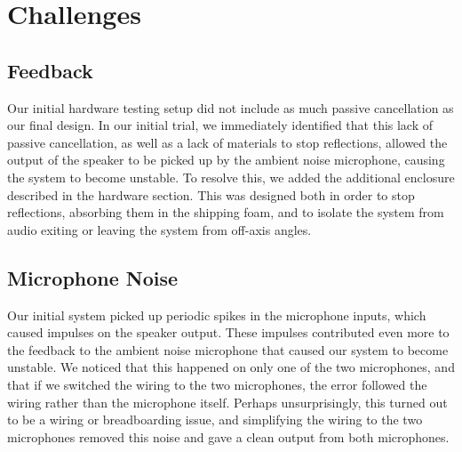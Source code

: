 \documentclass{fpgairpods}
\begin{document}
\section{Challenges}
\subsection{Feedback}
Our initial hardware testing setup did not include as much passive cancellation as our final design. In our initial trial, we immediately identified that this lack of passive cancellation, as well as a lack of materials to stop reflections, allowed the output of the speaker to be picked up by the ambient noise microphone, causing the system to become unstable. To resolve this, we added the additional enclosure described in the hardware section. This was designed both in order to stop reflections, absorbing them in the shipping foam, and to isolate the system from audio exiting or leaving the system from off-axis angles.

\subsection{Microphone Noise}
Our initial system picked up periodic spikes in the microphone inputs, which caused impulses on the speaker output. These impulses contributed even more to the feedback to the ambient noise microphone that caused our system to become unstable. We noticed that this happened on only one of the two microphones, and that if we switched the wiring to the two microphones, the error followed the wiring rather than the microphone itself. Perhaps unsurprisingly, this turned out to be a wiring or breadboarding issue, and simplifying the wiring to the two microphones removed this noise and gave a clean output from both microphones.
\end{document}

